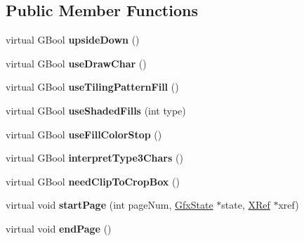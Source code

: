 \subsection*{Public Member Functions}
\begin{DoxyCompactItemize}
\item 
\mbox{\label{class_cairo_output_dev_ae12a3d1eb63c47a753ba5a7523760e3a}} 
virtual G\+Bool {\bfseries upside\+Down} ()
\item 
\mbox{\label{class_cairo_output_dev_ad8913041e385e982d1ae367266f1335a}} 
virtual G\+Bool {\bfseries use\+Draw\+Char} ()
\item 
\mbox{\label{class_cairo_output_dev_a60a701cf53165b6fd462312753acaf00}} 
virtual G\+Bool {\bfseries use\+Tiling\+Pattern\+Fill} ()
\item 
\mbox{\label{class_cairo_output_dev_ae1cc3a29bbadf4394fefbc10373d4659}} 
virtual G\+Bool {\bfseries use\+Shaded\+Fills} (int type)
\item 
\mbox{\label{class_cairo_output_dev_ae67de5c6482fb39dde2f114680c8c1d7}} 
virtual G\+Bool {\bfseries use\+Fill\+Color\+Stop} ()
\item 
\mbox{\label{class_cairo_output_dev_ad1727b59029af5bf2c5ced03e3271b6d}} 
virtual G\+Bool {\bfseries interpret\+Type3\+Chars} ()
\item 
\mbox{\label{class_cairo_output_dev_aabcbd1022c7a4646c2ed670ce0f73427}} 
virtual G\+Bool {\bfseries need\+Clip\+To\+Crop\+Box} ()
\item 
\mbox{\label{class_cairo_output_dev_aed57b94fb94b4e0157e202c9106bb0b3}} 
virtual void {\bfseries start\+Page} (int page\+Num, \hyperlink{class_gfx_state}{Gfx\+State} $\ast$state, \hyperlink{class_x_ref}{X\+Ref} $\ast$xref)
\item 
\mbox{\label{class_cairo_output_dev_a92721c5c0d8433ed59c4344acb5d0d75}} 
virtual void {\bfseries end\+Page} ()
\item 
\mbox{\label{class_cairo_output_dev_acbb552448299c1b80a09add46a38d119}} 

\end{DoxyCompactItemize}
